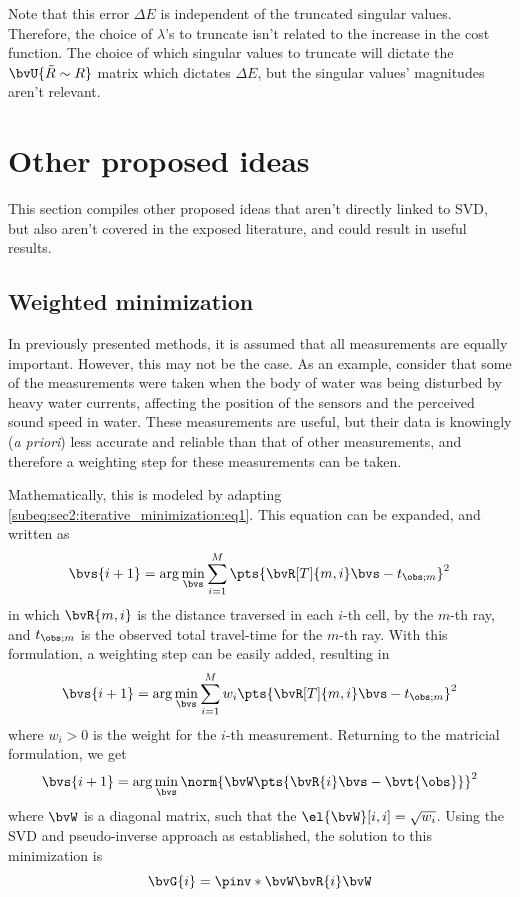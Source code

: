 {Note that this error $\Delta E$ is independent of the truncated singular values. Therefore, the choice of $\lambda$'s to truncate isn't related to the increase in the cost function. The choice of which singular values to truncate will dictate the $\bvU{\tilde{R}\sim R}$ matrix which dictates $\Delta E$, but the singular values' magnitudes aren't relevant.

\section{Other proposed ideas}

This section compiles other proposed ideas that aren't directly linked to SVD, but also aren't covered in the exposed literature, and could result in useful results.

\subsection{Weighted minimization}

In previously presented methods, it is assumed that all measurements are equally important. However, this may not be the case. As an example, consider that some of the measurements were taken when the body of water was being disturbed by heavy water currents, affecting the position of the sensors and the perceived sound speed in water. These measurements are useful, but their data is knowingly (\textit{a priori}) less accurate and reliable than that of other measurements, and therefore a weighting step for these measurements can be taken.

Mathematically, this is modeled by adapting \cref{subeq:sec2:iterative_minimization:eq1}. This equation can be expanded, and written as
\begin{equation}
	\bvs{i+1} = \arg \min_{\bvs} \sum_{i=1}^{M} \pts{\bvR[T]{m,i} \bvs - t_{\obs;m}}^2
\end{equation}
in which $\bvR{m,i}$ is the distance traversed in each $i$-th cell, by the $m$-th ray, and $t_{\obs;m}$ is the observed total travel-time for the $m$-th ray. With this formulation, a weighting step can be easily added, resulting in
\begin{equation}
	\bvs{i+1} = \arg \min_{\bvs} \sum_{i=1}^{M} w_i \pts{\bvR[T]{m,i} \bvs - t_{\obs;m}}^2
\end{equation}
where $w_i > 0$ is the weight for the $i$-th measurement. Returning to the matricial formulation, we get
\begin{equation}
	\bvs{i+1} = \arg \min_{\bvs} \norm{\bvW \pts{\bvR{i} \bvs - \bvt{\obs}}}^2
\end{equation}
where $\bvW$ is a diagonal matrix, such that the $\el{\bvW}[i,i] = \sqrt{w_i}$. Using the SVD and pseudo-inverse approach as established, the solution to this minimization is
\begin{equation}
	\bvG{i} = \pinv*{\bvW \bvR{i}} \bvW
	\label{eq:sec3:Gi_weighted_minim}
\end{equation}

}
